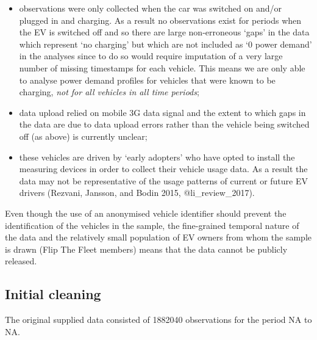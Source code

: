 \documentclass[]{article}
\providecommand{\tightlist}{%
  \setlength{\itemsep}{0pt}\setlength{\parskip}{0pt}}
\begin{document}
\begin{itemize}
\tightlist
\item
  observations were only collected when the car was switched on and/or plugged in and charging. As a result no observations exist for periods when the EV is switched off and so there are large non-erroneous `gaps' in the data which represent `no charging' but which are not included as `0 power demand' in the analyses since to do so would require imputation of a very large number of missing timestamps for each vehicle. This means we are only able to analyse power demand profiles for vehicles that were known to be charging, \emph{not for all vehicles in all time periods};
\item
  data upload relied on mobile 3G data signal and the extent to which gaps in the data are due to data upload errors rather than the vehicle being switched off (as above) is currently unclear;
\item
  these vehicles are driven by `early adopters' who have opted to install the measuring devices in order to collect their vehicle usage data. As a result the data may not be representative of the usage patterns of current or future EV drivers (Rezvani, Jansson, and Bodin 2015, @li\_review\_2017).
\end{itemize}

Even though the use of an anonymised vehicle identifier should prevent the identification of the vehicles in the sample, the fine-grained temporal nature of the data and the relatively small population of EV owners from whom the sample is drawn (Flip The Fleet members) means that the data cannot be publicly released.

\hypertarget{cleaning}{%
\subsection{Initial cleaning}\label{cleaning}}

The original supplied data consisted of 1882040 observations for the period NA to NA.
\end{document}
